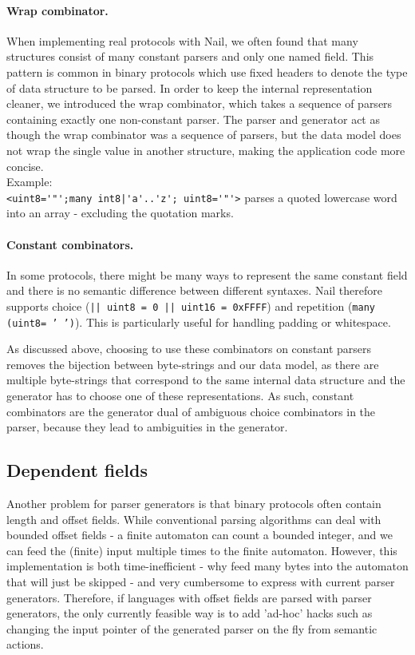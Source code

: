 \paragraph{Wrap combinator.} When implementing real protocols with Nail, we often found that many structures
consist of many constant parsers and only one named field. This pattern is
common in binary protocols which use fixed headers to denote the type of data
structure to be parsed.  In order to keep the internal representation cleaner,
we introduced the wrap combinator, which takes a sequence of parsers containing
exactly one non-constant parser. The parser and generator act as though the wrap
combinator was a sequence of parsers, but the data model does not wrap the
single value in another structure, making the application code more concise.\\
Example: \\ \verb+<uint8='"';many int8|'a'..'z'; uint8='"'>+  parses a quoted
lowercase word into an array - excluding the quotation marks.

\paragraph{Constant combinators.}
In some protocols, there might be many ways to represent the same constant field
and there is no semantic difference between different syntaxes.  Nail therefore
supports choice (\texttt{|| uint8 = 0 || uint16 = 0xFFFF}) and repetition
(\texttt{many (uint8= ' ')}). This is particularly useful for handling padding or whitespace.

As discussed above, choosing to use these combinators on constant parsers
removes the bijection between byte-strings and our data model, as there are
multiple byte-strings that correspond to the same internal data structure and
the generator has to choose one of these representations. As such, constant
combinators are the generator dual of ambiguous choice combinators in the
parser, because they lead to ambiguities in the generator.


\subsection{Dependent fields}
Another problem for parser generators is that binary protocols often contain
length and offset fields. While conventional parsing algorithms can deal with
bounded offset fields - a finite automaton can count a bounded integer, and we
can feed the (finite) input multiple times to the finite automaton. However,
this implementation is both time-inefficient - why feed many bytes into the
automaton that will just be skipped - and very cumbersome to express with
current parser generators. Therefore, if languages with offset fields are parsed
with parser generators, the only currently feasible way is to add 'ad-hoc' hacks
such as changing the input pointer of the generated parser on the fly from
semantic actions.

